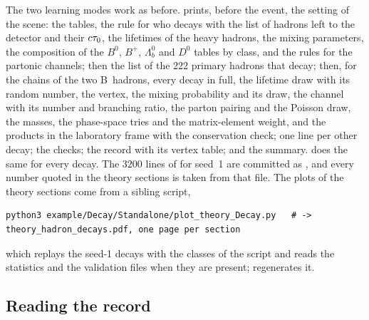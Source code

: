The two learning modes work as before.  prints, before the event,
the setting of the scene: the tables, the rule for who decays with the list
of hadrons left to the detector and their $c\tau_0$, the lifetimes of the
heavy hadrons, the mixing parameters, the composition of the $B^0$, $B^+$,
$\Lambda_b^0$ and $D^0$ tables by class, and the rules for the partonic
channels; then the list of the 222 primary hadrons that decay; then, for
the chains of the two B~hadrons, every decay in full, the lifetime draw
with its random number, the vertex, the mixing probability and its draw,
the channel with its number and branching ratio, the parton pairing and
the Poisson draw, the masses, the phase-space tries and the matrix-element
weight, and the products in the laboratory frame with the conservation
check; one line per other decay; the checks; the record with its vertex
table; and the summary.  does the same for every decay. The
$3200$ lines of  for seed~1 are committed as
, and every
number quoted in the theory sections is taken from that file. The plots of
the theory sections come from a sibling script,
\begin{verbatim}
python3 example/Decay/Standalone/plot_theory_Decay.py   # -> theory_hadron_decays.pdf, one page per section
\end{verbatim}
which replays the seed-1 decays with the classes of the script and reads
the  statistics and the \PYTHIA validation files when they
are present;  regenerates it.

\subsection{Reading the record}
\label{sec:children_producing_grandchildren:record_format}

